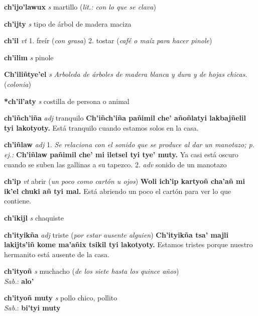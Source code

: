 \documentclass[10pt]{scrbook}
\newcommand{\entry}[1]{\textbf{#1}}
\newcommand{\onedefinition}[1]{#1.}
\newcommand{\nontranslationdef}[1]{\textit{#1}}
\newcommand{\partofspeech}[1]{\textit{#1}}
\newcommand{\spanishtranslation}[1]{#1}
\newcommand{\clarification}[1]{(\textit{#1})}
\newcommand{\cholexample}[1]{\textbf{#1}}
\newcommand{\exampletranslation}[1]{#1}
\newcommand{\dialectvariant}[1]{\\\textit{#1}:}
\newcommand{\dialectword}[1]{\textbf{#1}}
\begin{document}
\begin{multicols}{2}
\entry{ch'ijo'lawux}
\partofspeech{s}
\spanishtranslation{martillo}
\clarification{lit.: con lo que se clava}

\entry{ch'ijty}
\partofspeech{s}
\spanishtranslation{tipo de árbol de madera maciza}

\entry{ch'il}
\partofspeech{vt}
\onedefinition{1}
\spanishtranslation{freír}
\clarification{con grasa}
\onedefinition{2}
\spanishtranslation{tostar}
\clarification{café o maíz para hacer pinole}

\entry{ch'ilim}
\partofspeech{s}
\spanishtranslation{pinole}

\entry{Ch'iliñtye'el}
\partofspeech{s}
\nontranslationdef{Arboleda de árboles de madera blanca y dura y de hojas chicas.}
\clarification{colonia}

\entry{*ch'il'aty}
\partofspeech{s}
\spanishtranslation{costilla de persona o animal}

\entry{ch'iñch'iña}
\partofspeech{adj}
\spanishtranslation{tranquilo}
\cholexample{Ch'iñch'iña pañimil che' añoñlatyi lakbajñelil tyi lakotyoty.}
\exampletranslation{Está tranquilo cuando estamos solos en la casa.}

\entry{ch'iñlaw}
\partofspeech{adj}
\onedefinition{1}
\nontranslationdef{Se relaciona con el sonido que se produce al dar un manotazo; p. ej.:}
\cholexample{Ch'iñlaw pañimil che' mi iletsel tyi tye' muty.}
\exampletranslation{Ya casi está oscuro cuando se suben las gallinas a su tapezco.}
\onedefinition{2}
\partofspeech{adv}
\spanishtranslation{sonido de un manotazo}

\entry{ch'ip}
\partofspeech{vt}
\spanishtranslation{abrir}
\clarification{un poco como cartón u ojos}
\cholexample{Woli ich'ip kartyoñ cha'añ mi ik'el chuki añ tyi mal.}
\exampletranslation{Está abriendo un poco el cartón para ver lo que contiene.}

\entry{ch'ikijl}
\partofspeech{s}
\spanishtranslation{chaquiste}

\entry{ch'ityikña}
\partofspeech{adj}
\spanishtranslation{triste}
\clarification{por estar ausente alguien}
\cholexample{Ch'ityikña tsa' majli lakijts'iñ kome ma'añix tsikil tyi lakotyoty.}
\exampletranslation{Estamos tristes porque nuestro hermanito está ausente de la casa.}

\entry{ch'ityoñ}
\partofspeech{s}
\spanishtranslation{muchacho}
\clarification{de los siete hasta los quince años}
\dialectvariant{Sab.}
\dialectword{alo'}

\entry{ch'ityoñ muty}
\partofspeech{s}
\spanishtranslation{pollo chico, pollito}
\dialectvariant{Sab.}
\dialectword{bi'tyi muty}


\end{multicols}
\end{document}
